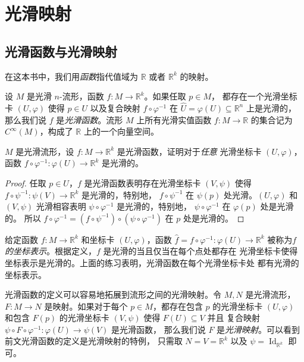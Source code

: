 \documentclass[fontset=none]{Notes}
\DeclareMathOperator\Id{Id}
\begin{document}
\chapter{光滑映射}

\section{光滑函数与光滑映射}

在这本书中，我们用\emph{函数}指代值域为 $\mathbb{R}$ 或者 $\mathbb{R}^k$
的映射。

设 $M$ 是光滑 $n$-流形，函数 $f:M\to\mathbb{R}^k$。如果任取 $p\in M$，
都存在一个光滑坐标卡 $(U,\varphi)$ 使得 $p\in U$ 以及复合映射
$f\circ\varphi^{-1}$ 在 $\hat U=\varphi(U)\subseteq\mathbb{R}^n$ 上是光滑的，
那么我们说 $f$ 是\emph{光滑函数}。流形 $M$ 上所有光滑实值函数 $f:M\to\mathbb{R}$
的集合记为 $C^\infty(M)$，构成了 $\mathbb{R}$ 上的一个向量空间。

\begin{exercise}{}{}
$M$ 是光滑流形，设 $f:M\to\mathbb{R}^k$ 是光滑函数，证明对于\emph{任意}
光滑坐标卡 $(U,\varphi)$，函数 $f\circ\varphi^{-1}:\varphi(U)\to\mathbb{R}^k$
是光滑的。
\end{exercise}
\begin{proof}
  任取 $p\in U$，$f$ 是光滑函数表明存在光滑坐标卡 $(V,\psi)$ 使得
  $f\circ\psi^{-1}:\psi(V)\to\mathbb{R}^k$ 是光滑的，特别地，
  $f\circ\psi^{-1}$ 在 $\psi(p)$ 处光滑。$(U,\varphi)$
  和 $(V,\psi)$ 光滑相容表明 $\psi\circ\varphi^{-1}$ 是光滑的，特别地，
  $\psi\circ\varphi^{-1}$ 在 $\varphi(p)$ 处是光滑的。
  所以 $f\circ\varphi^{-1}=(f\circ\psi^{-1})\circ(\psi\circ\varphi^{-1})$
  在 $p$ 处是光滑的。
\end{proof}

给定函数 $f:M\to\mathbb{R}^k$ 和坐标卡 $(U,\varphi)$，函数 $\hat f=f\circ\varphi^{-1}:\varphi(U)\to\mathbb{R}^k$
被称为\emph{$f$ 的坐标表示}。根据定义，$f$ 是光滑的当且仅当在每个点处都存在
光滑坐标卡使得坐标表示是光滑的。上面的练习表明，光滑函数在每个光滑坐标卡处
都有光滑的坐标表示。

光滑函数的定义可以容易地拓展到流形之间的光滑映射。令 $M,N$ 是光滑流形，
$F:M\to N$ 是映射。如果对于每个 $p\in M$，都存在包含 $p$ 的光滑坐标卡 $(U,\varphi)$
和包含 $F(p)$ 的光滑坐标卡 $(V,\psi)$ 使得 $F(U)\subseteq V$ 并且
复合映射 $\psi\circ F\circ\varphi^{-1}:\varphi(U)\to\psi(V)$ 是光滑函数，
那么我们说 $F$ 是\emph{光滑映射}。可以看到前文光滑函数的定义是光滑映射的特例，
只需取 $N=V=\mathbb{R}^k$ 以及 $\psi=\Id_{\mathbb{R}^k}$ 即可。
\end{document}
